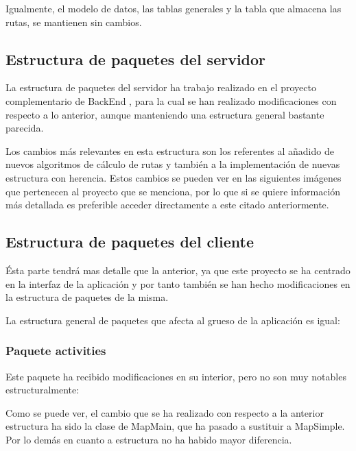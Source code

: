 Igualmente, el modelo de datos, las tablas generales y la tabla que almacena las rutas, se mantienen sin cambios.

\subsection{Estructura de paquetes del servidor}

La estructura de paquetes del servidor ha trabajo realizado en el proyecto complementario de BackEnd \cite{tfg2}, para la cual se han realizado modificaciones con respecto a lo anterior, aunque manteniendo una estructura general bastante parecida. 

Los cambios más relevantes en esta estructura son los referentes al añadido de nuevos algoritmos de cálculo de rutas y también a la implementación de nuevas estructura con herencia. Estos cambios se pueden ver en las siguientes imágenes que pertenecen al proyecto que se menciona, por lo que si se quiere información más detallada es preferible acceder directamente a este citado anteriormente.

\subsection{Estructura de paquetes del cliente}

Ésta parte tendrá mas detalle que la anterior, ya que este proyecto se ha centrado en la interfaz de la aplicación y por tanto también se han hecho modificaciones en la estructura de paquetes de la misma.

La estructura general de paquetes que afecta al grueso de la aplicación es igual:



\subsubsection{Paquete activities}

Este paquete ha recibido modificaciones en su interior, pero no son muy notables estructuralmente:


Como se puede ver, el cambio que se ha realizado con respecto a la anterior estructura ha sido la clase de MapMain, que ha pasado a sustituir a MapSimple. Por lo demás en cuanto a estructura no ha habido mayor diferencia.


